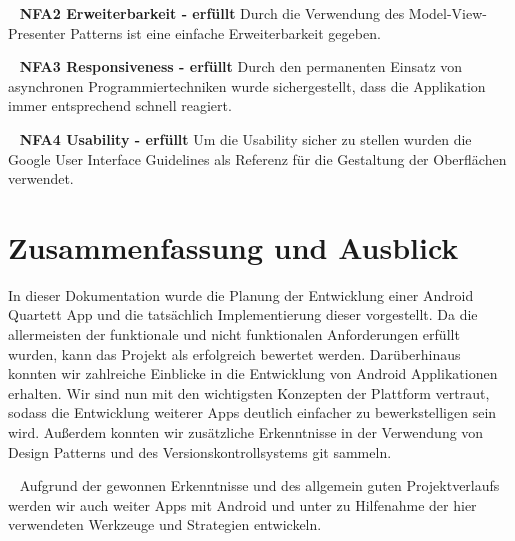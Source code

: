 \documentclass{scrartcl}
\begin{document}
\ \newline
\textbf{NFA2 Erweiterbarkeit - erfüllt} \newline
Durch die Verwendung des Model-View-Presenter Patterns ist eine einfache
Erweiterbarkeit gegeben.

\ \newline
\textbf{NFA3 Responsiveness - erfüllt} \newline
Durch den permanenten Einsatz von asynchronen Programmiertechniken wurde
sichergestellt, dass die Applikation immer entsprechend schnell reagiert.

\ \newline
\textbf{NFA4 Usability - erfüllt} \newline
Um die Usability sicher zu stellen wurden die Google User Interface Guidelines
als Referenz für die Gestaltung der Oberflächen verwendet.

\section{Zusammenfassung und Ausblick}

In dieser Dokumentation wurde die Planung der Entwicklung einer Android Quartett
App und die tatsächlich Implementierung dieser vorgestellt. Da die allermeisten
der funktionale und nicht funktionalen Anforderungen erfüllt wurden, kann das
Projekt als erfolgreich bewertet werden. Darüberhinaus konnten wir zahlreiche
Einblicke in die Entwicklung von Android Applikationen erhalten. Wir sind nun
mit den wichtigsten Konzepten der Plattform vertraut, sodass die Entwicklung
weiterer Apps deutlich einfacher zu bewerkstelligen sein wird. Außerdem konnten
wir zusätzliche Erkenntnisse in der Verwendung von Design Patterns und des
Versionskontrollsystems git sammeln.

\ \newline
Aufgrund der gewonnen Erkenntnisse und des allgemein guten Projektverlaufs werden
wir auch weiter Apps mit Android und unter zu Hilfenahme der hier verwendeten
Werkzeuge und Strategien entwickeln.
\end{document}
